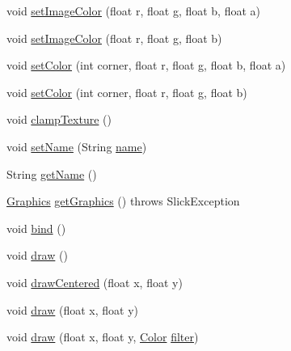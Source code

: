 \begin{DoxyCompactItemize}
\item 
void \mbox{\hyperlink{classorg_1_1newdawn_1_1slick_1_1_image_af46e21c381a61a3b4fda007bdf51d284}{set\+Image\+Color}} (float r, float g, float b, float a)
\item 
void \mbox{\hyperlink{classorg_1_1newdawn_1_1slick_1_1_image_ab7df84c734ae5f63e4fdaafbbcac81eb}{set\+Image\+Color}} (float r, float g, float b)
\item 
void \mbox{\hyperlink{classorg_1_1newdawn_1_1slick_1_1_image_a15a9f59a7b0d8d8b95c0393cb0f435cd}{set\+Color}} (int corner, float r, float g, float b, float a)
\item 
void \mbox{\hyperlink{classorg_1_1newdawn_1_1slick_1_1_image_acaf13b37e17ee30f89aadf780d794efd}{set\+Color}} (int corner, float r, float g, float b)
\item 
void \mbox{\hyperlink{classorg_1_1newdawn_1_1slick_1_1_image_a18d37e5c346d316dda2fc5a523d43422}{clamp\+Texture}} ()
\item 
void \mbox{\hyperlink{classorg_1_1newdawn_1_1slick_1_1_image_a7f0efd66a0c8e5ee400a05d22c542388}{set\+Name}} (String \mbox{\hyperlink{classorg_1_1newdawn_1_1slick_1_1_image_a6965c875dc3a3106ccbcc7a6b308c240}{name}})
\item 
String \mbox{\hyperlink{classorg_1_1newdawn_1_1slick_1_1_image_a3d7329c13259ffebd9efc30deb5655fc}{get\+Name}} ()
\item 
\mbox{\hyperlink{classorg_1_1newdawn_1_1slick_1_1_graphics}{Graphics}} \mbox{\hyperlink{classorg_1_1newdawn_1_1slick_1_1_image_aa4b12d568452597b58cdb69d49e625a4}{get\+Graphics}} ()  throws Slick\+Exception 
\item 
void \mbox{\hyperlink{classorg_1_1newdawn_1_1slick_1_1_image_ad5e41640d7b1b235926f3d248935e694}{bind}} ()
\item 
void \mbox{\hyperlink{classorg_1_1newdawn_1_1slick_1_1_image_a9bddcca05c7140ab45df8ac5b250b6cd}{draw}} ()
\item 
void \mbox{\hyperlink{classorg_1_1newdawn_1_1slick_1_1_image_a4edd600dd696e709937dad16ced8c9b9}{draw\+Centered}} (float x, float y)
\item 
void \mbox{\hyperlink{classorg_1_1newdawn_1_1slick_1_1_image_a47a2d7ef96a03050ac9718d2c22129e6}{draw}} (float x, float y)
\item 
void \mbox{\hyperlink{classorg_1_1newdawn_1_1slick_1_1_image_aa632cf747d9e4d507cdd6df0cf80f842}{draw}} (float x, float y, \mbox{\hyperlink{classorg_1_1newdawn_1_1slick_1_1_color}{Color}} \mbox{\hyperlink{classorg_1_1newdawn_1_1slick_1_1_image_a1c6f09687817420f3762f32bb1c3ed76}{filter}})

\end{DoxyCompactItemize}
